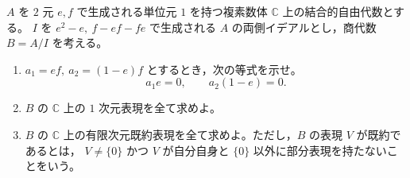 \documentclass[12pt]{jlreq}
\newcommand{\C}{\mathbb{C}}
\begin{document}
\(A\) を \(2\) 元 \(e,f\) で生成される単位元 \(1\) を持つ複素数体 \(\C\) 上の結合的自由代数とする。
\(I\) を \(e^2-e,\ f-ef-fe\) で生成される \(A\) の両側イデアルとし，商代数 \(B=A/I\) を考える。

\begin{enumerate}
  \item \(a_1=ef,\ a_2=(1-e)f\) とするとき，次の等式を示せ。
  \[
    a_1e=0,\qquad a_2(1-e)=0.
  \]
  \item \(B\) の \(\C\) 上の \(1\) 次元表現を全て求めよ。
  \item \(B\) の \(\C\) 上の有限次元既約表現を全て求めよ。ただし，\(B\) の表現 \(V\) が既約であるとは，
  \(V\ne\{0\}\) かつ \(V\) が自分自身と \(\{0\}\) 以外に部分表現を持たないことをいう。
\end{enumerate}
\end{document}
